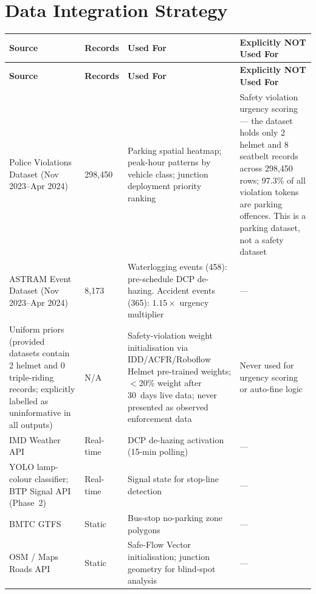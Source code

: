 \documentclass[11pt,a4paper]{article}
\begin{document}
\section{Data Integration Strategy}
\begin{longtable}{L{3cm} C{1.8cm} L{4.5cm} L{5cm}}
    \toprule
    \color{white}\textbf{Source} & \color{white}\textbf{Records} & \color{white}\textbf{Used For} & \color{white}\textbf{Explicitly NOT Used For} \\
    \midrule
    \endfirsthead
    \toprule
    \color{white}\textbf{Source} & \color{white}\textbf{Records} & \color{white}\textbf{Used For} & \color{white}\textbf{Explicitly NOT Used For} \\
    \midrule
    \endhead
    \bottomrule
    \endfoot

    Police Violations Dataset (Nov 2023--Apr 2024) & 298,450 & Parking spatial heatmap; peak-hour patterns by vehicle class; junction deployment priority ranking & Safety violation urgency scoring --- the dataset holds only 2 helmet and 8 seatbelt records across 298,450 rows; 97.3\% of all violation tokens are parking offences. This is a parking dataset, not a safety dataset \\
    ASTRAM Event Dataset (Nov 2023--Apr 2024) & 8,173 & Waterlogging events (458): pre-schedule DCP de-hazing. Accident events (365): $1.15\times$ urgency multiplier & --- \\
    Uniform priors (provided datasets contain 2 helmet and 0 triple-riding records; explicitly labelled as uninformative in all outputs) & N/A & Safety-violation weight initialisation via IDD/ACFR/Roboflow Helmet pre-trained weights; $<$20\% weight after 30~days live data; never presented as observed enforcement data & Never used for urgency scoring or auto-fine logic \\
    IMD Weather API & Real-time & DCP de-hazing activation (15-min polling) & --- \\
    YOLO lamp-colour classifier; BTP Signal API (Phase~2) & Real-time & Signal state for stop-line detection & --- \\
    BMTC GTFS & Static & Bus-stop no-parking zone polygons & --- \\
    OSM / Maps Roads API & Static & Safe-Flow Vector initialisation; junction geometry for blind-spot analysis & --- \\
\end{longtable}
\end{document}
